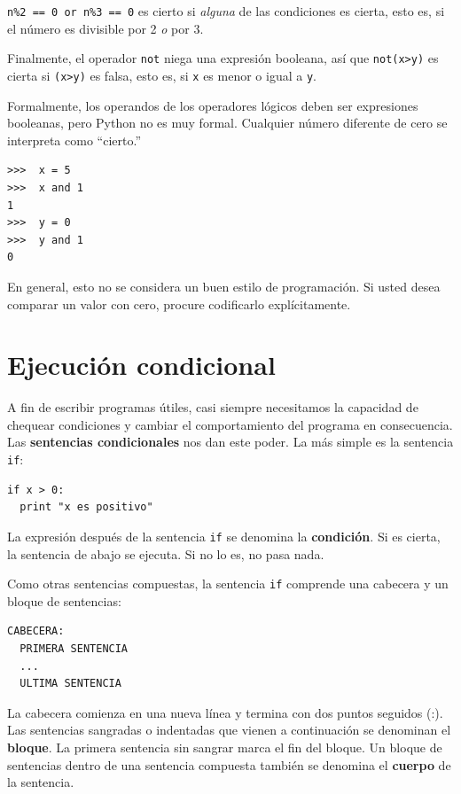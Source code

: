 \texttt{n\%2 == 0 or n\%3 == 0} es cierto si {\em alguna} de las condiciones
es cierta, esto es, si el número es divisible por 2 {\em o} por 3.

Finalmente, el operador \texttt{not} niega una expresión booleana,
así que  \texttt{not(x>y)} es cierta si \texttt{(x>y)} es falsa,
esto es, si \texttt{x} es menor o igual a \texttt{y}.

Formalmente, los operandos de los operadores lógicos deben ser
expresiones booleanas, pero Python no es muy formal. Cualquier
número diferente de cero se interpreta como ``cierto.''

\beforeverb
\begin{verbatim}
>>>  x = 5
>>>  x and 1
1
>>>  y = 0
>>>  y and 1
0
\end{verbatim}
\afterverb
%
En general, esto no se considera un buen estilo de programación.
Si usted desea comparar un valor con cero, procure codificarlo explícitamente.


\section{Ejecución condicional}
\label{alternative execution}

A fin de escribir programas útiles, casi siempre necesitamos la capacidad
de chequear condiciones y cambiar el comportamiento del programa en 
consecuencia. Las {\bf sentencias condicionales} nos dan este poder. La
 más simple es la sentencia \texttt{if}:

\beforeverb
\begin{verbatim}
if x > 0:
  print "x es positivo"
\end{verbatim}
\afterverb
%
La expresión después de la sentencia \texttt{if} se denomina
la {\bf condición}.  Si es cierta, la sentencia de abajo se
ejecuta. Si no lo es, no pasa nada.


Como otras sentencias compuestas, la sentencia \texttt{if}
comprende una cabecera y un bloque de sentencias:

\beforeverb
\begin{verbatim}
CABECERA:
  PRIMERA SENTENCIA
  ...
  ULTIMA SENTENCIA
\end{verbatim}
\afterverb
%
La cabecera comienza en una nueva línea y termina con dos puntos
seguidos (:).  Las sentencias sangradas o indentadas que
vienen a continuación se denominan el {\bf bloque}.
La primera sentencia sin sangrar marca el fin del bloque. Un bloque
de sentencias dentro de una sentencia compuesta también se denomina 
el {\bf cuerpo} de la sentencia.


